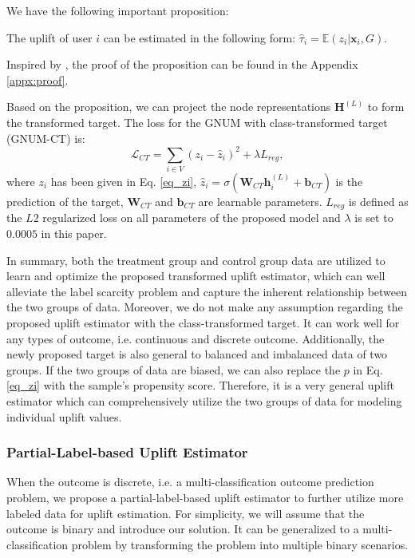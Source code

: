 We have the following important proposition: 
\begin{prop}
The uplift of user $i$ can be estimated in the following form: $\hat{\tau}_i=\mathbb{E}(z_i|\mathbf{x}_i, \mathit{G})$.
\end{prop}

\renewcommand{\qedsymbol}{}
Inspired by \cite{athey2015machine}, the proof of the proposition can be found in the Appendix \ref{appx:proof}.

Based on the proposition, we can project the node representations $\mathbf{H}^{(L)}$ to form the transformed target. The loss for the GNUM with class-transformed target (GNUM-CT) is:
\begin{equation}\label{eq:loss_ct}
	\mathcal{L}_{CT} =  \sum_{i \in \mathit{V}}{( {z}_{i} -\hat{z}_{i})^2}+\lambda L_{reg},
\end{equation}
where $z_i$ has been given in Eq. \eqref{eq_zi}, $\hat{{z}}_{i}= \sigma(\mathbf{W}_{CT}\mathbf{h}_i^{(L)}+\mathbf{b}_{CT})$ is the prediction of the target, $\mathbf{W}_{CT}$ and $\mathbf{b}_{CT}$ are learnable parameters. $L_{reg}$ is defined as the $L2$ regularized loss on all parameters of the proposed model and $\lambda$ is set to $0.0005$ in this paper.   

In summary, both the treatment group and control group data are utilized to learn and optimize the proposed transformed uplift estimator, which can well alleviate the label scarcity problem and capture the inherent relationship between the two groups of data. Moreover, we do not make any assumption regarding the proposed uplift estimator with the class-transformed target. It can work well for any types of outcome, i.e. continuous and discrete outcome. Additionally, the newly proposed target is also general to balanced and imbalanced data of two groups. If the two groups of data are biased, we can also replace the $p$ in Eq. \eqref{eq_zi} with the sample's propensity score. Therefore, it is a very general uplift estimator which can comprehensively utilize the two groups of data for modeling individual uplift values. 
 
\subsubsection{Partial-Label-based Uplift Estimator}
When the outcome is discrete, i.e. a multi-classification outcome prediction problem,  we propose a partial-label-based uplift estimator to further utilize more labeled data for uplift estimation. For simplicity, we will assume that the outcome is binary and introduce our solution. It can be generalized to a multi-classification problem by transforming the problem into multiple binary scenarios. 

